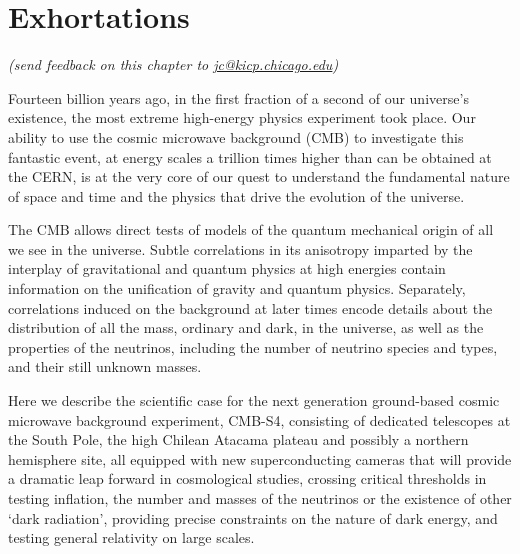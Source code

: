  
\chapter{Exhortations}
\label{chap:intro}





\begin{center}
{\small \it (send feedback on this chapter to \href{mailto:jc@kicp.chicago.edu}{jc@kicp.chicago.edu})}
\end{center}

Fourteen billion years ago, in the first fraction of a second of our universe's existence, the most extreme high-energy physics experiment took place. Our ability to use the cosmic microwave background (CMB) to investigate this fantastic event, at energy scales a trillion times higher than can be obtained at the CERN, is at the very core of our quest to understand the fundamental nature of space and time and the physics that drive the evolution of the universe. 

The CMB allows direct tests of models of the quantum mechanical origin of all we see in the universe. Subtle correlations in its anisotropy imparted by the interplay of gravitational and quantum physics at high energies contain information on the unification of gravity and quantum physics. Separately, correlations induced on the background at later times encode details about the distribution of all the mass, ordinary and dark, in the universe, as well as the properties of the neutrinos, including the number of neutrino species and types, and their still unknown masses. 

Here we describe the scientific case for the next generation ground-based cosmic microwave background experiment, CMB-S4, consisting of dedicated telescopes at the South Pole, the high Chilean Atacama plateau and possibly a northern hemisphere site, all equipped with new superconducting cameras that will provide a dramatic leap forward in cosmological studies, crossing critical thresholds in testing inflation, the number and masses of the neutrinos or the existence of other `dark radiation', providing precise constraints on the nature of dark energy, and testing general relativity on large scales. 

